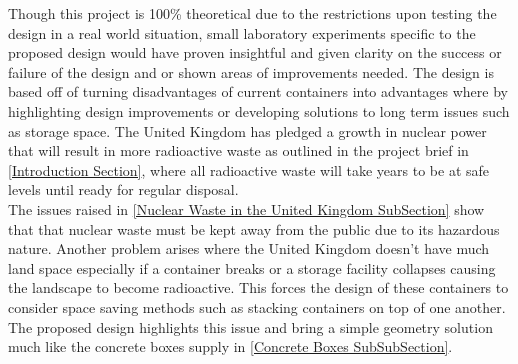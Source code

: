 Though this project is 100\% theoretical due to the restrictions upon testing the design in a real world situation, small laboratory experiments specific to the proposed design would have proven insightful and given clarity on the success or failure of the design and or shown areas of improvements needed. The design is based off of turning disadvantages of current containers into advantages where by highlighting design improvements or developing solutions to long term issues such as storage space. The United Kingdom has pledged a growth in nuclear power that will result in more radioactive waste as outlined in the project brief in \cref{Introduction Section}, where all radioactive waste will take years to be at safe levels until ready for regular disposal. \\

The issues raised in \cref{Nuclear Waste in the United Kingdom SubSection} show that that nuclear waste must be kept away from the public due to its hazardous nature. Another problem arises where the United Kingdom doesn't have much land space especially if a container breaks or a storage facility collapses causing the landscape to become radioactive. This forces the design of these containers to consider space saving methods such as stacking containers on top of one another. The proposed design highlights this issue and bring a simple geometry solution much like the concrete boxes supply in \cref{Concrete Boxes SubSubSection}. \\

